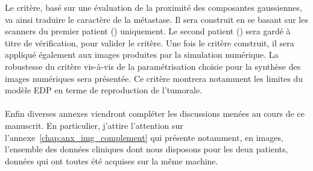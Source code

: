 \documentclass[main.tex]{subfiles}
\begin{document}
Le critère, basé sur une évaluation de la proximité des %
composantes gaussiennes, va ainsi traduire le caractère \heterogene de la métastase. 
Il sera construit en se basant sur les scanners du premier patient (\Nber) uniquement. 
Le second patient (\Chen) sera gardé à titre de vérification, pour valider le critère. 
Une fois le critère construit, il sera appliqué également aux images produites par la simulation numérique. 
La robustesse du critère vis-à-vis de la paramétrisation choisie pour la synthèse des images  numériques sera présentée. 
Ce critère montrera notamment les limites du modèle EDP en terme de reproduction de l'\hetero tumorale.

\paragraph{}
Enfin diverses annexes viendront compléter les discussions menées au cours de ce manuscrit. En particulier, j'attire l'attention sur l'annexe~\ref{chap:anx_img_complement} qui présente notamment, en images, l'ensemble des données cliniques dont nous disposons pour les deux patients, données qui ont toutes été acquises sur la même machine. 
\end{document}
